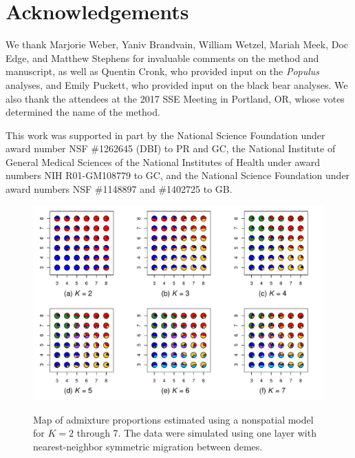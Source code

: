 \documentclass[10pt,letterpaper]{article}
\newif\ifsubmissionversion
\newif\ifincludesupplement
\newif\iffloatsatend
\begin{document}
\section*{Acknowledgements}

We thank Marjorie Weber, Yaniv Brandvain, William Wetzel, 
Mariah Meek, Doc Edge, and Matthew Stephens 
for invaluable comments on the method and manuscript, 
as well as Quentin Cronk, who provided input on the \textit{Populus} analyses, 
and Emily Puckett, who provided input on the black bear analyses.
We also thank the attendees at the 2017 SSE Meeting in Portland, OR, 
whose votes determined the name of the method.
\ifsubmissionversion
\else
This work was supported in part by 
the National Science Foundation under award number NSF \#1262645 (DBI) to PR and GC, 
the National Institute of General Medical Sciences of the National
Institutes of Health under award numbers NIH R01-GM108779 to GC,
and the National Science Foundation under award numbers NSF \#1148897 and \#1402725 to GB.
\fi


\newpage
\clearpage



\ifincludesupplement

\clearpage
\newpage
\section*{Supplementary Information}
\renewcommand{\theequation}{S\arabic{equation}}
\setcounter{equation}{0}
\renewcommand{\thetable}{S\arabic{table}}
\setcounter{table}{0}
\renewcommand{\thefigure}{S\arabic{figure}}
\setcounter{figure}{0}

\iffloatsatend
\processdelayedfloats
\fi


\begin{figure}
	\centering
		{\includegraphics[width=\textwidth]{figs/sims/simK1_nsp_pies.pdf}}
	\caption{
	Map of admixture proportions estimated using a nonspatial model for $K=2$ through 7.
	The data were simulated using one layer with nearest-neighbor symmetric migration between demes.
    }\label{simK1_nsp_pies}
\end{figure}
\end{document}
